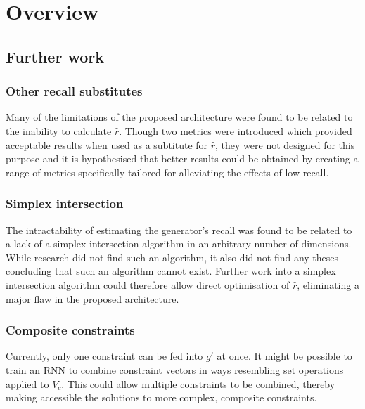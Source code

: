 \documentclass[../../main.tex]{subfiles}
\begin{document}
\chapter{Overview} \label{chapter:overview}

\section{Further work} \label{section:furtherWork}

\subsection{Other recall substitutes} \label{subsection:otherRecallSubstitutes}

Many of the limitations of the proposed architecture were found to be related to the inability to calculate $\hat{r}$.
Though two metrics were introduced which provided acceptable results when used as a subtitute for $\hat{r}$, they were not designed for this purpose and it is hypothesised that better results could be obtained by creating a range of metrics specifically tailored for alleviating the effects of low recall.

\subsection{Simplex intersection} \label{subsection:simplexIntersection}

The intractability of estimating the generator's recall was found to be related to a lack of a simplex intersection algorithm in an arbitrary number of dimensions.
While research did not find such an algorithm, it also did not find any theses concluding that such an algorithm cannot exist.
Further work into a simplex intersection algorithm could therefore allow direct optimisation of $\hat{r}$, eliminating a major flaw in the proposed architecture.

\subsection{Composite constraints} \label{subsection:compositeConstraints}

Currently, only one constraint can be fed into $g'$ at once.
It might be possible to train an RNN to combine constraint vectors in ways resembling set operations applied to $V_c$.
This could allow multiple constraints to be combined, thereby making accessible the solutions to more complex, composite constraints.
\end{document}
